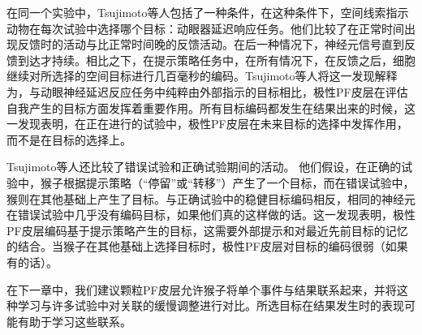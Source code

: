 在同一个实验中，Tsujimoto等人包括了一种条件，在这种条件下，空间线索指示动物在每次试验中选择哪个目标：动眼器延迟响应任务。他们比较了在正常时间出现反馈时的活动与比正常时间晚的反馈活动。在后一种情况下，神经元信号直到反馈到达才持续。相比之下，在提示策略任务中，在所有情况下，在反馈之后，细胞继续对所选择的空间目标进行几百毫秒的编码。Tsujimoto等人将这一发现解释为，与动眼神经延迟反应任务中纯粹由外部指示的目标相比，极性PF皮层在评估自我产生的目标方面发挥着重要作用。所有目标编码都发生在结果出来的时候，这一发现表明，在正在进行的试验中，极性PF皮层在未来目标的选择中发挥作用，而不是在目标的选择上。\par
Tsujimoto等人还比较了错误试验和正确试验期间的活动。
他们假设，在正确的试验中，猴子根据提示策略（“停留”或“转移”）产生了一个目标，而在错误试验中，猴则在其他基础上产生了目标。与正确试验中的稳健目标编码相反，相同的神经元在错误试验中几乎没有编码目标，如果他们真的这样做的话。这一发现表明，极性PF皮层编码基于提示策略产生的目标，这需要外部提示和对最近先前目标的记忆的结合。当猴子在其他基础上选择目标时，极性PF皮层对目标的编码很弱（如果有的话）。\par
在下一章中，我们建议颗粒PF皮层允许猴子将单个事件与结果联系起来，并将这种学习与许多试验中对关联的缓慢调整进行对比。所选目标在结果发生时的表现可能有助于学习这些联系。\par
